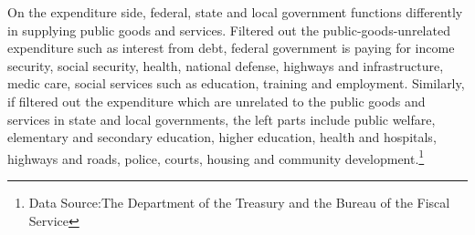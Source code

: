 On the expenditure side, federal, state and local government functions differently in supplying public goods and services. Filtered out the public-goods-unrelated expenditure such as interest from debt, federal government is paying for income security, social security, health, national defense, highways and infrastructure, medic care, social services such as education, training and employment. Similarly, if filtered out the expenditure which are unrelated to the public goods and services in state and local governments, the left parts include public welfare, elementary and secondary education, higher education, health and hospitals, highways and roads, police, courts, housing and community development.\footnote[2]{Data Source:The Department of the Treasury and the Bureau of the Fiscal Service }
\begin{figure}[H]
    \centering  %


\end{figure}
